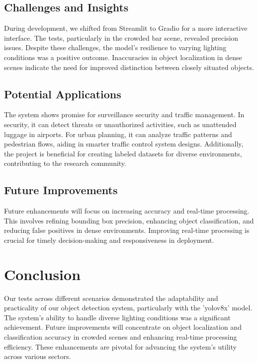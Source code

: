 \documentclass[10pt]{extarticle}
\begin{document}
\subsection{Challenges and Insights}
During development, we shifted from Streamlit to Gradio for a more interactive interface. The tests, particularly in the crowded bar scene, revealed precision issues. Despite these challenges, the model's resilience to varying lighting conditions was a positive outcome. Inaccuracies in object localization in dense scenes indicate the need for improved distinction between closely situated objects.

\subsection{Potential Applications}
The system shows promise for surveillance security and traffic management. In security, it can detect threats or unauthorized activities, such as unattended luggage in airports. For urban planning, it can analyze traffic patterns and pedestrian flows, aiding in smarter traffic control system designs. Additionally, the project is beneficial for creating labeled datasets for diverse environments, contributing to the research community.

\subsection{Future Improvements}
Future enhancements will focus on increasing accuracy and real-time processing. This involves refining bounding box precision, enhancing object classification, and reducing false positives in dense environments. Improving real-time processing is crucial for timely decision-making and responsiveness in deployment.

\section{Conclusion}
Our tests across different scenarios demonstrated the adaptability and practicality of our object detection system, particularly with the 'yolov8x' model. The system's ability to handle diverse lighting conditions was a significant achievement. Future improvements will concentrate on object localization and classification accuracy in crowded scenes and enhancing real-time processing efficiency. These enhancements are pivotal for advancing the system's utility across various sectors.

\newpage
\end{document}
